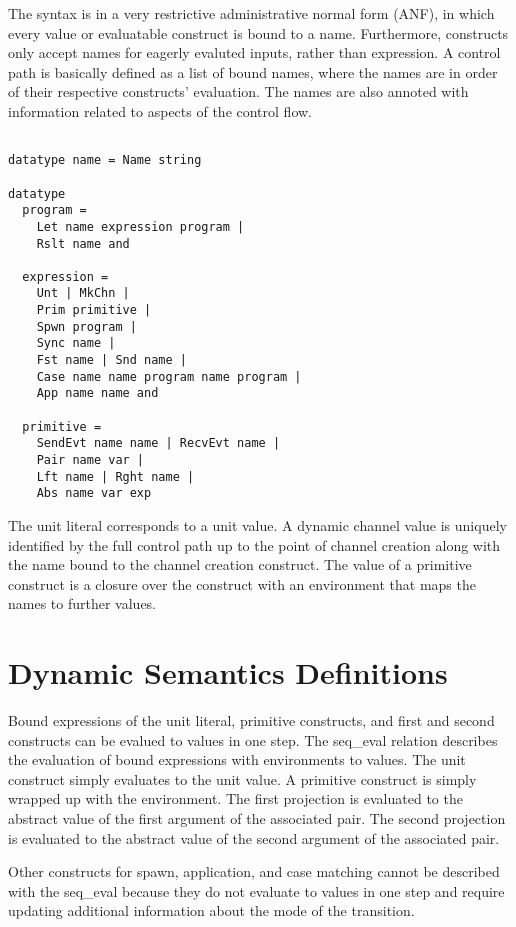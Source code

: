 \documentclass{article}
\begin{document}
The syntax is in a very restrictive administrative normal form (ANF), in which every value or
evaluatable construct is bound to a name.  Furthermore, constructs only accept names for
eagerly evaluted inputs, rather than expression.  A control path is basically defined as a list
of bound names, where the names are in order of their respective constructs' evaluation. The
names are also annoted with information related to aspects of the control flow. 

\begin{lstlisting}[language=logic, escapechar=\%]

datatype name = Name string

datatype 
  program = 
    Let name expression program |
    Rslt name and 

  expression = 
    Unt | MkChn |
    Prim primitive |
    Spwn program |
    Sync name |
    Fst name | Snd name |
    Case name name program name program |
    App name name and 

  primitive = 
    SendEvt name name | RecvEvt name |
    Pair name var |
    Lft name | Rght name |
    Abs name var exp

  \end{lstlisting}


The unit literal corresponds to a unit value. A dynamic channel value is uniquely identified by
the full control path up to the point of channel creation along with the name bound to the
channel creation construct. The value of a primitive construct is a closure over the construct
with an environment that maps the names to further values.

\section{Dynamic Semantics Definitions}

Bound expressions of the unit literal, primitive constructs, and first and second constructs
can be evalued to values in one step. The seq\_eval relation describes the evaluation of bound
expressions with environments to values. The unit construct simply evaluates to the unit
value.  A primitive construct is simply wrapped up with the environment.  The first projection is
evaluated to the abstract value of the first argument of the associated pair. The second
projection is evaluated to the abstract value of the second argument of the associated pair.

Other constructs for spawn, application, and case matching cannot be described with the
seq\_eval because they do not evaluate to values in one step and require updating additional
information about the mode of the transition. 
\end{document}
